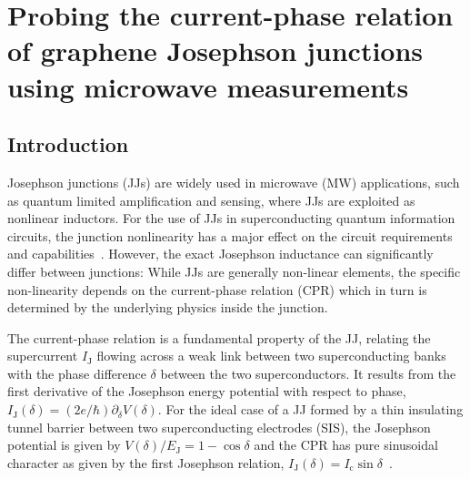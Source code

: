 \newchapstyle
\chapter{Probing the current-phase relation of graphene Josephson junctions using microwave measurements}
\label{chap:gJJ-CPR}


\begin{abstract}
	We perform extensive analysis of graphene Josephson junctions embedded in microwave circuits.
	By comparing a diffusive junction at \SI{15}{\milli\kelvin} with a ballistic one at \SI{15}{\milli\kelvin} and \SI{1}{\kelvin}, we are able to reconstruct the current-phase relation.
\end{abstract}

\afterpage{\pagecolor{none}}\newpage

\section{Introduction}

Josephson junctions (JJs) are widely used in microwave (MW) applications, such as quantum limited amplification and sensing, where JJs are exploited as nonlinear inductors.
%
For the use of JJs in superconducting quantum information circuits, the junction nonlinearity has a major effect on the circuit requirements and capabilities~\cite{kringhojAnharmonicitySuperconductingQubit2018}.
%
However, the exact Josephson inductance can significantly differ between junctions:
%
While JJs are generally non-linear elements, the specific non-linearity depends on the current-phase relation (CPR) which in turn is determined by the underlying physics inside the junction.

The current-phase relation is a fundamental property of the JJ, relating the supercurrent $I_\text{J}$ flowing across a weak link between two superconducting banks with the phase difference $\delta$ between the two superconductors.
%
It results from the first derivative of the Josephson energy potential with respect to phase, $I_\text{J}(\delta) = (2e/\hbar) \partial_\delta V(\delta)$.
%
For the ideal case of a JJ formed by a thin insulating tunnel barrier between two superconducting electrodes (SIS), the Josephson potential is given by $V(\delta)/E_\text{J}=1-\cos\delta$ and the CPR has pure sinusoidal character as given by the first Josephson relation, $I_\text{J}(\delta) = I_\text{c}\sin\delta$~\cite{josephsonPossibleNewEffects1962,josephsonSupercurrentsBarriers1965}.

